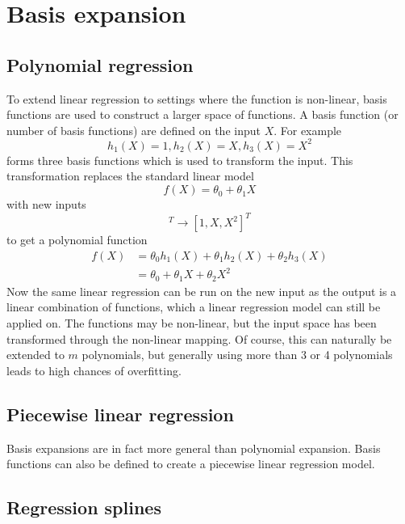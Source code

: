 \documentclass[CS5104-Notes.tex]{subfiles}
\begin{document}
\section{Basis expansion}

\subsection{Polynomial regression}
To extend linear regression to settings where the function is non-linear, basis functions are used to construct a larger space of functions. A basis function (or number of basis functions) are defined on the input $X$. For example
\begin{equation}
h_{1}(X) = 1, h_{2}(X) = X, h_{3}(X) = X^{2}
\end{equation}
forms three basis functions which is used to transform the input. This transformation replaces the standard linear model
\begin{equation}
f(X) = \theta_{0} + \theta_{1}X
\end{equation}
with new inputs
\begin{equation}
[h_{1}(X), h_{2}(X), h_{3}(X)]^{T} \rightarrow [1,X,X^{2}]^{T}
\end{equation}
to get a polynomial function
\begin{align}
f(X) &= \theta_{0}h_{1}(X) + \theta_{1}h_{2}(X) + \theta_{2}h_{3}(X) \\
 &= \theta_{0} + \theta_{1}X + \theta_{2}X^{2}
\end{align}
Now the same linear regression can be run on the new input as the output is a linear combination of functions, which a linear regression model can still be applied on. The functions may be non-linear, but the input space has been transformed through the non-linear mapping. Of course, this can naturally be extended to $m$ polynomials, but generally using more than 3 or 4 polynomials leads to high chances of overfitting.

\subsection{Piecewise linear regression} Basis expansions are in fact more general than polynomial expansion. Basis functions can also be defined to create a piecewise linear regression model. 

\subsection{Regression splines}
\end{document}
